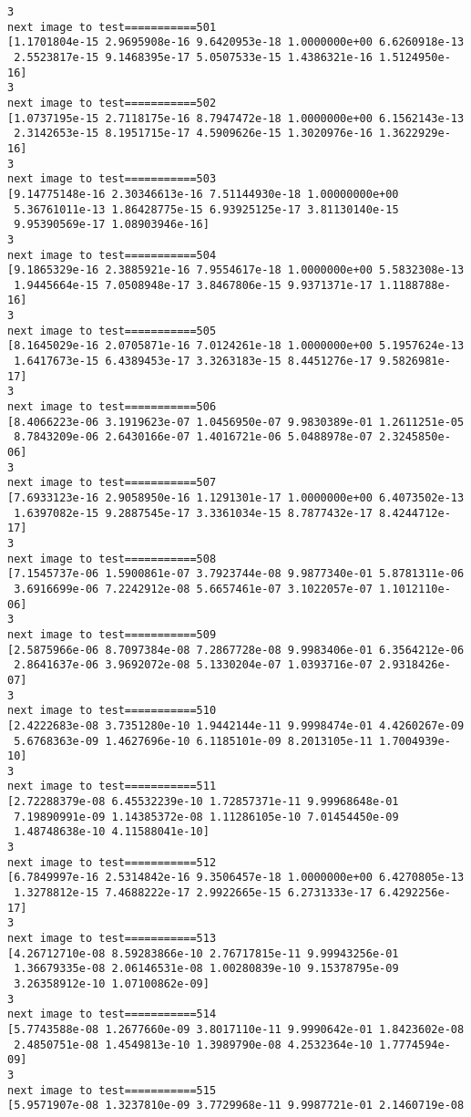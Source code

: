 \documentclass[11pt]{article}
\begin{document}
\begin{Verbatim}[commandchars=\\\{\}]
3
next image to test===========501
[1.1701804e-15 2.9695908e-16 9.6420953e-18 1.0000000e+00 6.6260918e-13
 2.5523817e-15 9.1468395e-17 5.0507533e-15 1.4386321e-16 1.5124950e-16]
3
next image to test===========502
[1.0737195e-15 2.7118175e-16 8.7947472e-18 1.0000000e+00 6.1562143e-13
 2.3142653e-15 8.1951715e-17 4.5909626e-15 1.3020976e-16 1.3622929e-16]
3
next image to test===========503
[9.14775148e-16 2.30346613e-16 7.51144930e-18 1.00000000e+00
 5.36761011e-13 1.86428775e-15 6.93925125e-17 3.81130140e-15
 9.95390569e-17 1.08903946e-16]
3
next image to test===========504
[9.1865329e-16 2.3885921e-16 7.9554617e-18 1.0000000e+00 5.5832308e-13
 1.9445664e-15 7.0508948e-17 3.8467806e-15 9.9371371e-17 1.1188788e-16]
3
next image to test===========505
[8.1645029e-16 2.0705871e-16 7.0124261e-18 1.0000000e+00 5.1957624e-13
 1.6417673e-15 6.4389453e-17 3.3263183e-15 8.4451276e-17 9.5826981e-17]
3
next image to test===========506
[8.4066223e-06 3.1919623e-07 1.0456950e-07 9.9830389e-01 1.2611251e-05
 8.7843209e-06 2.6430166e-07 1.4016721e-06 5.0488978e-07 2.3245850e-06]
3
next image to test===========507
[7.6933123e-16 2.9058950e-16 1.1291301e-17 1.0000000e+00 6.4073502e-13
 1.6397082e-15 9.2887545e-17 3.3361034e-15 8.7877432e-17 8.4244712e-17]
3
next image to test===========508
[7.1545737e-06 1.5900861e-07 3.7923744e-08 9.9877340e-01 5.8781311e-06
 3.6916699e-06 7.2242912e-08 5.6657461e-07 3.1022057e-07 1.1012110e-06]
3
next image to test===========509
[2.5875966e-06 8.7097384e-08 7.2867728e-08 9.9983406e-01 6.3564212e-06
 2.8641637e-06 3.9692072e-08 5.1330204e-07 1.0393716e-07 2.9318426e-07]
3
next image to test===========510
[2.4222683e-08 3.7351280e-10 1.9442144e-11 9.9998474e-01 4.4260267e-09
 5.6768363e-09 1.4627696e-10 6.1185101e-09 8.2013105e-11 1.7004939e-10]
3
next image to test===========511
[2.72288379e-08 6.45532239e-10 1.72857371e-11 9.99968648e-01
 7.19890991e-09 1.14385372e-08 1.11286105e-10 7.01454450e-09
 1.48748638e-10 4.11588041e-10]
3
next image to test===========512
[6.7849997e-16 2.5314842e-16 9.3506457e-18 1.0000000e+00 6.4270805e-13
 1.3278812e-15 7.4688222e-17 2.9922665e-15 6.2731333e-17 6.4292256e-17]
3
next image to test===========513
[4.26712710e-08 8.59283866e-10 2.76717815e-11 9.99943256e-01
 1.36679335e-08 2.06146531e-08 1.00280839e-10 9.15378795e-09
 3.26358912e-10 1.07100862e-09]
3
next image to test===========514
[5.7743588e-08 1.2677660e-09 3.8017110e-11 9.9990642e-01 1.8423602e-08
 2.4850751e-08 1.4549813e-10 1.3989790e-08 4.2532364e-10 1.7774594e-09]
3
next image to test===========515
[5.9571907e-08 1.3237810e-09 3.7729968e-11 9.9987721e-01 2.1460719e-08

\end{Verbatim}
\end{document}

